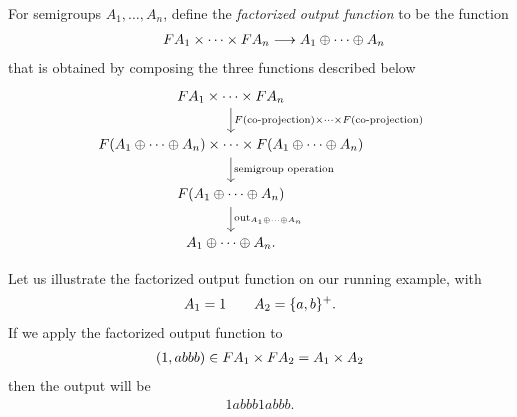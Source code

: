 For semigroups $A_1,\ldots,A_n$, define the \emph{factorized output function} to be the 
function%
\begin{align*}
\qquad\functor A_1 \times \cdots \times \functor A_n \longrightarrow A_1 \oplus \cdots \oplus A_n
\end{align*}
that is obtained by composing the three functions described below
\[
\begin{tikzcd}
\functor A_1 \times \cdots \times \functor A_n
\ar[d,"\functor(\text{co-projection}) \times \cdots \times \functor(\text{co-projection})"]
\\
\functor(A_1 \oplus \cdots \oplus A_n)
\times
\cdots
\times 
\functor(A_1 \oplus \cdots \oplus A_n)
\ar[d,"\text{semigroup operation}"]
\\
\functor(A_1 \oplus \cdots \oplus A_n)
\ar[d, "\outfun_{A_1 \oplus \cdots \oplus A_n}"]\\ 
A_1 \oplus \cdots \oplus A_n.
\end{tikzcd}
\]

Let us illustrate the factorized output function on our running example, with 
\begin{align*}
A_1 = 1 \qquad A_2 = \{a,b\}^+.
\end{align*}
If we apply the factorized output function to 
\begin{align*}
(1, abbb)  \in \functor A_1 \times \functor A_2 = A_1 \times A_2
\end{align*}
then the output will be 
\begin{align*}
1 abbb 1 abbb.
\end{align*}

